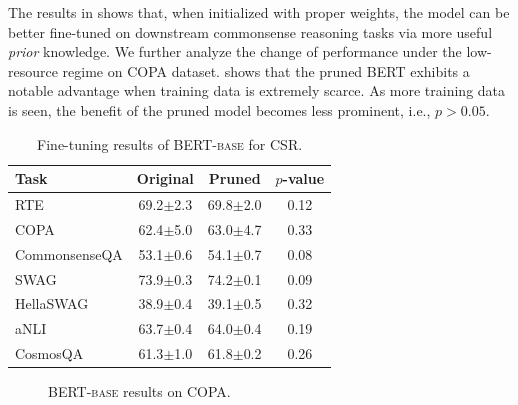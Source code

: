 The results in  shows that, when initialized with proper weights, the model can be better fine-tuned on downstream commonsense reasoning tasks via more useful \textit{prior} knowledge. We further analyze the change of performance under the low-resource regime on COPA dataset.  shows that the pruned \textsc{BERT} exhibits a notable advantage when training data is extremely scarce. As more training data is seen, the benefit of the pruned 
model becomes less prominent, i.e., $p>0.05$.
\begin{table}[t!]
	\centering
	\scriptsize
	\begin{tabular}{l|cc|c}
		\toprule
		\textbf{Task} & \textbf{Original} & \textbf{Pruned} &$p$-value \\
		\midrule
		RTE & 69.2$\pm${\scriptsize 2.3} & 69.8$\pm${\scriptsize2.0}& 0.12\\

		COPA & 62.4$\pm${\scriptsize 5.0} & 63.0$\pm${\scriptsize 4.7} &0.33  \\

		CommonsenseQA & 53.1$\pm${\scriptsize 0.6} & 54.1$\pm${\scriptsize 0.7} &0.08\\

		SWAG & 73.9$\pm${\scriptsize 0.3} & 74.2$\pm${\scriptsize 0.1} &0.09\\
		HellaSWAG & 38.9$\pm${\scriptsize 0.4} & 39.1$\pm${\scriptsize 0.5}&0.32  \\
		aNLI &63.7$\pm${\scriptsize 0.4} &64.0$\pm${\scriptsize 0.4}  &0.19\\
		CosmosQA &61.3$\pm${\scriptsize 1.0} &61.8$\pm${\scriptsize 0.2} &0.26\\
		\bottomrule
	\end{tabular}
	\caption{Fine-tuning results of \textsc{BERT-base} for CSR.}
	\label{table:finetuning}
\end{table}
\begin{figure}[t]
	\centering
	\caption{\textsc{BERT-base} results on COPA.} \label{fig:copa}
\end{figure}
